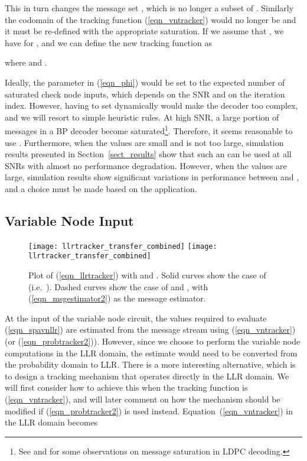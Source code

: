 \documentclass[12pt,journal,twoside,draftcls,onecolumn]{IEEEtran}
\begin{document}
	This in turn changes the message set , which is no longer a subset of . Similarly the codomain of the tracking function (\ref{eqn_vntracker}) would no longer be  and it must be re-defined with the appropriate saturation. If we assume that , we have  for , and we can define the new tracking function as
	
	where  and .
	
	Ideally, the parameter  in (\ref{eqn_phi}) would be set to the expected number of saturated check node inputs, which depends on the SNR and on the iteration index. However, having to set  dynamically would make the decoder too complex, and we will resort to simple heuristic rules.
	At high SNR, a large portion of messages in a BP decoder become saturated\footnote{See \cite{varnica:2007} and \cite{schlegel:2010} for some observations on message saturation in LDPC decoding.}. Therefore, it seems reasonable to use . Furthermore, when the  values are small and  is not too large, simulation results presented in Section~\ref{sect_results} show that such an  can be used at all SNRs with almost no performance degradation. However, when the  values are large, simulation results show significant variations in performance between  and , and a choice must be made based on the application.

	
	\subsection{Variable Node Input} \label{sect_implementation::llrtrackers}
	
	\begin{figure}[tbp]
	\begin{center}
\ifCLASSOPTIONdraftcls
	\texttt{[image: llrtracker\_transfer\_combined]}
\else
	\texttt{[image: llrtracker\_transfer\_combined]}
\fi
	\caption{Plot of (\ref{eqn_llrtracker}) with  and . Solid curves show the case of  (i.e.~). Dashed curves show the case of  and , with (\ref{eqn_msgestimator2}) as the message estimator.}
	\label{fig_llrtracker}
	\end{center}
	\end{figure}
	
	
	At the input of the variable node circuit, the values required to evaluate (\ref{eqn_spavnllr}) are estimated from the message stream using (\ref{eqn_vntracker}) (or (\ref{eqn_probtracker2})). However, since we choose to perform the variable node computations in the LLR domain, the estimate would need to be converted from the probability domain to LLR.
	There is a more interesting alternative, which is to design a tracking mechanism that operates directly in the LLR domain. 
	We will first consider how to achieve this when the tracking function is (\ref{eqn_vntracker}), and will later comment on how the mechanism should be modified if (\ref{eqn_probtracker2}) is used instead. Equation~(\ref{eqn_vntracker}) in the LLR domain becomes
	
\end{document}

